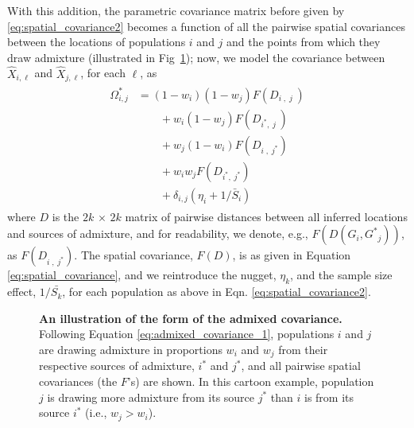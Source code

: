 \documentclass[10pt,letterpaper]{article}
\newcommand{\identifyadmixsource}[1]{{#1^{*}}}
\begin{document}
With this addition, the parametric covariance matrix before given by \eqref{eq:spatial_covariance2}
becomes a function of all the pairwise spatial covariances between the locations of populations $i$ and $j$ and the points from which they draw admixture 
(illustrated in Fig\ \ref{sfig:admixed_cov_diagram});
now, we model the covariance between $\hat X_{i,\ell}$ and $\hat X_{j,\ell}$, for each $\ell$, as
\begin{align}
\label{eq:admixed_covariance_1}\begin{split}
\identifyadmixsource{\Omega_{i,j}} 
    &= 
  (1-w_i)(1-w_j) F(D_{i\;,\;j\;}) \\
  &\qquad {} + w_i(1-w_j) F(D_{\identifyadmixsource{i},\;j\;})    \\
  &\qquad {} + w_j(1-w_i) F(D_{i\;,\;\identifyadmixsource{j}})    \\
  &\qquad {} + w_i w_j F(D_{\identifyadmixsource{i},\;\identifyadmixsource{j}})    \\
  &\qquad {} + \delta_{i,j} (\eta_i + 1 / \bar{S}_i) 
\end{split}
\end{align}
where $D$ is the $2k \, \times \, 2k$ matrix of pairwise distances between all inferred locations and sources of admixture, 
and for readability, we denote, e.g., $F(D(G_i,\identifyadmixsource{G}_j))$, as $F(D_{i\;,\;\identifyadmixsource{j}})$.
The spatial covariance, $F(D)$, is as given in Equation \eqref{eq:spatial_covariance}, and we reintroduce the nugget, $\eta_k$, and the sample size effect, $1/\bar{S_k}$, for each population as above in Eqn. \eqref{eq:spatial_covariance2}.
%
\begin{figure}[ht!]
\begin{center}
\end{center}
\caption{
\textbf{An illustration of the form of the admixed covariance.}
Following Equation \eqref{eq:admixed_covariance_1}, populations $i$ and $j$ are drawing admixture in proportions $w_i$ and $w_j$ from their respective sources of admixture, $\identifyadmixsource{i}$ and $\identifyadmixsource{j}$, and all pairwise spatial covariances (the $F$'s) are shown.  In this cartoon example, population $j$ is drawing more admixture from its source $\identifyadmixsource{j}$ than $i$ is from its source $\identifyadmixsource{i}$ (i.e., $w_j > w_i$).
}\label{sfig:admixed_cov_diagram}
\end{figure}
\end{document}

